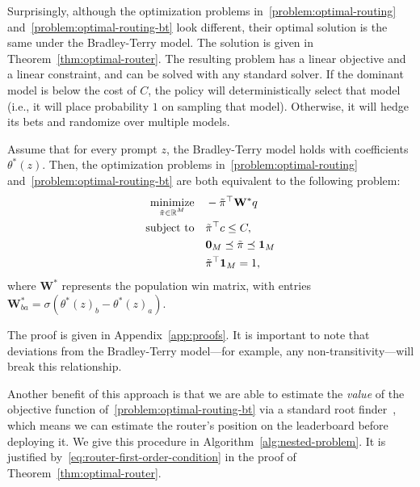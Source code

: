 Surprisingly, although the optimization problems in~\eqref{problem:optimal-routing} and~\eqref{problem:optimal-routing-bt} look different, their optimal solution is the same under the Bradley-Terry model. 
The solution is given in Theorem~\ref{thm:optimal-router}.
The resulting problem has a linear objective and a linear constraint, and can be solved with any standard solver.
If the dominant model is below the cost of $C$, the policy will deterministically select that model (i.e., it will place probability $1$ on sampling that model).
Otherwise, it will hedge its bets and randomize over multiple models.
\begin{theorem}
    \label{thm:optimal-router}
    Assume that for every prompt $z$, the Bradley-Terry model holds with coefficients $\theta^*(z)$. 
    Then, the optimization problems in~\eqref{problem:optimal-routing} and~\eqref{problem:optimal-routing-bt} are both equivalent to the following problem:
    \begin{equation} 
        \label{problem:optimal-routing-master}
        \begin{aligned}
            \operatorname*{minimize}_{\substack{\tilde\pi \in \mathbb{R}^M }} \quad & -\tilde\pi^\top \mathbf{W}^*q\\
            \operatorname{subject\,\,to} \quad & \tilde\pi^\top c \leq C, \\
            & \mathbf{0}_M \preceq \tilde\pi \preceq \mathbf{1}_M \\
            & \tilde\pi^\top \mathbf{1}_M = 1,
        \end{aligned}
    \end{equation}
    where $\mathbf{W^*}$ represents the population win matrix, with entries $\mathbf{W}^*_{ba} = \sigma(\theta^*(z)_b - \theta^*(z)_a)$.
\end{theorem}
The proof is given in Appendix~\ref{app:proofs}.
It is important to note that deviations from the Bradley-Terry model---for example, any non-transitivity---will break this relationship.

Another benefit of this approach is that we are able to estimate the \emph{value} of the objective function of~\eqref{problem:optimal-routing-bt} via a standard root finder~\cite{brent1973-chapter4}, which means we can estimate the router's position on the leaderboard before deploying it.
We give this procedure in Algorithm~\ref{alg:nested-problem}.
It is justified by~\eqref{eq:router-first-order-condition} in the proof of Theorem~\ref{thm:optimal-router}.
    

